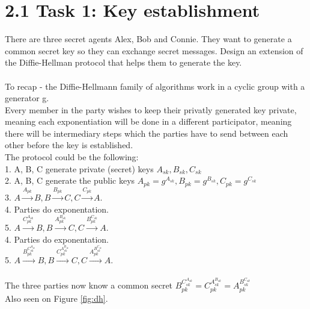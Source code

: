 \documentclass{article}
\begin{document}
\section{2.1 Task 1:  Key establishment} %
There are three secret agents Alex, Bob and Connie. They want to generate a common secret key so they can exchange secret
messages. Design an extension of the Diffie-Hellman protocol that helps them to generate the key.
\\\\
To recap - the Diffie-Hellmann family of algorithms work in a cyclic group with a generator g.
\\
Every member in the party wishes to keep their privatly generated key private, meaning each exponentiation
will be done in a different participator, meaning there will be intermediary steps which the parties have 
to send between each other before the key is established. 
\\
The protocol could be the following:\\
1. A, B, C generate private (secret) keys $A_{sk}, B_{sk}, C_{sk}$ \\
2. A, B, C generate the public keys $A_{pk} = g^{A_{sk}}, B_{pk} = g^{B_{sk}}, C_{pk} = g^{C_{sk}}$\\
3. $A \xrightarrow{A_{pk}} B, B \xrightarrow{B_{pk}} C, C \xrightarrow{C_{pk}} A$.\\
4. Parties do exponentation.\\
5. $A \xrightarrow{C_{pk}^{A_{sk}}} B, B \xrightarrow{A_{pk}^{B_{sk}}} C, C \xrightarrow{B_{pk}^{C_{sk}}} A$.\\
4. Parties do exponentation.\\
5. $A \xrightarrow{{B_{pk}^{C_{sk}^{A_{sk}}}}} B, B \xrightarrow{C_{pk}^{A_{sk}^{B_{sk}}}} C, C \xrightarrow{A_{pk}^{B_{sk}^{C_{sk}}}} A$.\\
\\The three parties now know a common secret ${B_{pk}^{C_{sk}^{A_{sk}}}} = C_{pk}^{A_{sk}^{B_{sk}}} = A_{pk}^{B_{sk}^{C_{sk}}}$
\\Also seen on Figure \ref{fig:dh}.
\\\\
\end{document}
